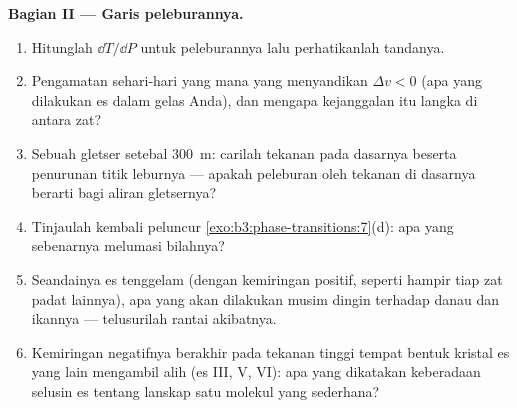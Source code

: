 \begin{problem}
\medskip\noindent\textbf{Bagian II --- Garis peleburannya.}
\begin{enumerate}[resume]
  \item Hitunglah $\dd T/\dd P$ untuk peleburannya lalu perhatikanlah tandanya.
  \item Pengamatan sehari-hari yang mana yang menyandikan $\Delta v < 0$
        (apa yang dilakukan es dalam gelas Anda), dan mengapa
        kejanggalan itu langka di antara zat?
  \item Sebuah gletser setebal \qty{300}{m}: carilah tekanan pada dasarnya
        beserta penurunan titik leburnya --- apakah peleburan oleh
        tekanan di dasarnya berarti bagi aliran gletsernya?
  \item Tinjaulah kembali peluncur
        \cref{exo:b3:phase-transitions:7}(d): apa yang sebenarnya
        melumasi bilahnya?
  \item Seandainya es tenggelam (dengan kemiringan positif, seperti
        hampir tiap zat padat lainnya), apa yang akan dilakukan musim
        dingin terhadap danau dan ikannya --- telusurilah rantai akibatnya.
  \item Kemiringan negatifnya berakhir pada tekanan tinggi tempat bentuk
        kristal es yang lain mengambil alih (es III, V, VI): apa yang
        dikatakan keberadaan selusin es tentang lanskap  satu
        molekul yang sederhana?
\end{enumerate}


\end{problem}
